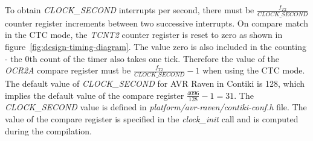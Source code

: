 To obtain {\it{CLOCK\_SECOND}} interrupts per second, there must be
${\frac{f_{T2}}{CLOCK\_SECOND}}$ counter register increments between two successive interrupts.
On compare match in the CTC mode, the {\it{TCNT2}} counter register is reset to zero as
shown in figure~\ref{fig:design-timing-diagram}.
The value zero is also included in the counting - the 0th count of the timer also takes one tick.
Therefore the value of the {\it{OCR2A}} compare register must be ${\frac{f_{T2}}{CLOCK\_SECOND}} - 1$
when using the CTC mode.
The default value of {\it{CLOCK\_SECOND}} for AVR Raven in Contiki is 128,
which implies the default value of the compare register ${\frac{4096}{128}} - 1 = 31$.
The {\it{CLOCK\_SECOND}} value is defined in {\it{platform/avr-raven/contiki-conf.h}} file.
The value of the compare register is specified in the {\it{clock\_init}} call
and is computed during the compilation.
